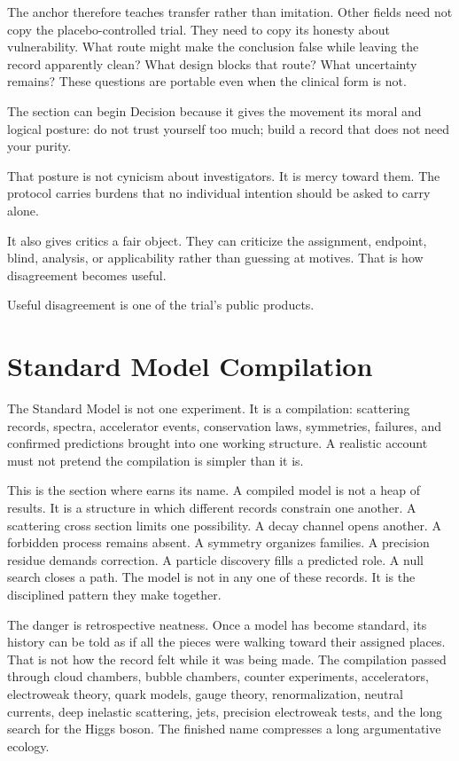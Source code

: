 The anchor therefore teaches transfer rather than imitation. Other fields
need not copy the placebo-controlled trial. They need to copy its honesty
about vulnerability. What route might make the conclusion false while leaving
the record apparently clean? What design blocks that route? What uncertainty
remains? These questions are portable even when the clinical form is not.

The section can begin Decision because it gives the movement its moral and
logical posture: do not trust yourself too much; build a record that does
not need your purity.

That posture is not cynicism about investigators. It is mercy toward them.
The protocol carries burdens that no individual intention should be asked to
carry alone.

It also gives critics a fair object. They can criticize the assignment,
endpoint, blind, analysis, or applicability rather than guessing at motives.
That is how disagreement becomes useful.

Useful disagreement is one of the trial's public products.

\section{Standard Model Compilation}

The Standard Model is not one experiment. It is a compilation: scattering
records, spectra, accelerator events, conservation laws, symmetries, failures,
and confirmed predictions brought into one working structure. A realistic
account must not pretend the compilation is simpler than it is.

This is the section where  earns its name. A compiled model is
not a heap of results. It is a structure in which different records constrain
one another. A scattering cross section limits one possibility. A decay
channel opens another. A forbidden process remains absent. A symmetry
organizes families. A precision residue demands correction. A particle
discovery fills a predicted role. A null search closes a path. The model is
not in any one of these records. It is the disciplined pattern they make
together.

The danger is retrospective neatness. Once a model has become standard, its
history can be told as if all the pieces were walking toward their assigned
places. That is not how the record felt while it was being made. The
compilation passed through cloud chambers, bubble chambers, counter
experiments, accelerators, electroweak theory, quark models, gauge theory,
renormalization, neutral currents, deep inelastic scattering, jets, precision
electroweak tests, and the long search for the Higgs boson. The finished name
compresses a long argumentative ecology.

